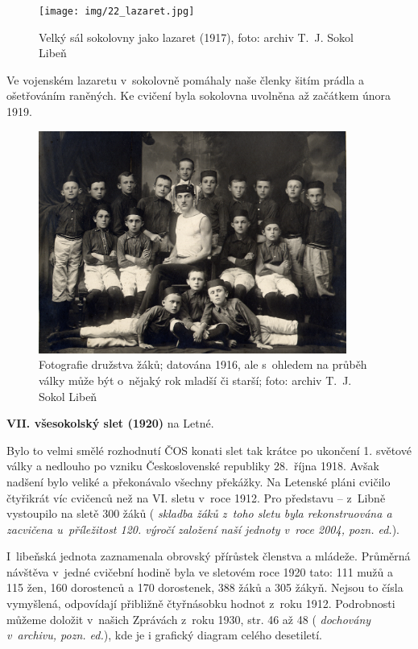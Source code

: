 \documentclass[a5paper, 11pt, twoside]{article}
\newcommand{\pozned}[1]{%
\textit{#1}}
\begin{document}
\begin{figure}[h!]
  \centering 
  \texttt{[image: img/22\_lazaret.jpg]}
  \caption*{Velký sál sokolovny jako lazaret (1917), foto: archiv T.~J. Sokol
  Libeň}
\end{figure}

Ve vojenském lazaretu v~sokolovně pomáhaly naše členky šitím prádla a
ošetřováním raněných. Ke cvičení byla sokolovna uvolněna až začátkem
února 1919.

\begin{figure}[h!]
  \centering 
  \includegraphics[width=0.9\textwidth]{img/21_zaci_1916.jpg}
  \caption*{Fotografie družstva žáků; datována 1916, ale s~ohledem na průběh
  války může být o~nějaký rok mladší či starší; foto: archiv T.~J.
  Sokol Libeň}
\end{figure}

\textbf{VII. všesokolský slet (1920)} na Letné.

Bylo to velmi smělé rozhodnutí ČOS konati slet tak krátce po ukončení 1.
světové války a nedlouho po vzniku Československé republiky 28.~října
1918. Avšak nadšení bylo veliké a překonávalo všechny překážky. Na
Letenské pláni cvičilo čtyřikrát víc cvičenců než na VI. sletu v~roce
1912. Pro představu -- z~Libně vystoupilo na sletě 300 žáků
(\pozned{skladba žáků z~toho sletu byla rekonstruována a zacvičena
u~příležitost 120. výročí založení naší jednoty v~roce 2004, pozn. ed.}).

I~libeňská jednota zaznamenala obrovský přírůstek členstva a mládeže.
Průměrná návštěva v~jedné cvičební hodině byla ve sletovém roce 1920
tato: 111 mužů a 115 žen, 160 dorostenců a 170 dorostenek, 388 žáků a
305 žákyň. Nejsou to čísla vymyšlená, odpovídají přibližně čtyřnásobku
hodnot z~roku 1912. Podrobnosti můžeme doložit v~našich Zprávách z~roku
1930, str. 46 až 48 (\pozned{dochovány v~archivu, pozn. ed.}), kde je i
grafický diagram celého desetiletí.
\end{document}
